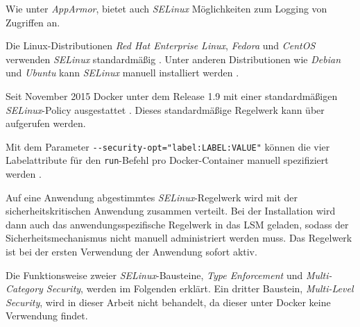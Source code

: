 \documentclass[../main.tex]{subfiles}
\begin{document}
				Wie unter \emph{AppArmor}, bietet auch \emph{SELinux} Möglichkeiten zum Logging von Zugriffen an.

				Die Linux-Distributionen \emph{Red Hat Enterprise Linux}, \emph{Fedora} und \emph{CentOS} verwenden \emph{SELinux} standardmäßig \cite{dockerSecurity}. Unter anderen Distributionen wie \emph{Debian} und \emph{Ubuntu} kann \emph{SELinux} manuell installiert werden \cite{selinuxDebian}\cite{selinuxUbuntu}.

				Seit November 2015 Docker unter dem Release 1.9 mit einer standardmäßigen \emph{SELinux}-Policy ausgestattet \cite{githubDockerChangelog}\cite{githubSELinuxPolicyIssue}.
				 Dieses standardmäßige Regelwerk kann über \cite{githubSELinuxProfile} aufgerufen werden.

				Mit dem Parameter \texttt{-{}-security-opt="{}label:LABEL:VALUE"{}} können die vier Labelattribute für den \texttt{run}-Befehl pro Docker-Container manuell spezifiziert werden \cite{dockerRun}.



				Auf eine Anwendung abgestimmtes \emph{SELinux}-Regelwerk wird mit der sicherheitskritischen Anwendung zusammen verteilt. Bei der Installation wird dann auch das anwendungsspezifische Regelwerk in das LSM geladen, sodass der Sicherheitsmechanismus nicht manuell administriert werden muss. Das Regelwerk ist bei der ersten Verwendung der Anwendung sofort aktiv.

				Die Funktionsweise zweier \emph{SELinux}-Bausteine, \emph{Type Enforcement} und \emph{Multi-Category Security}, werden im Folgenden erklärt. Ein dritter Baustein, \emph{Multi-Level Security}, wird in dieser Arbeit nicht behandelt, da dieser unter Docker keine Verwendung findet.


\end{document}
